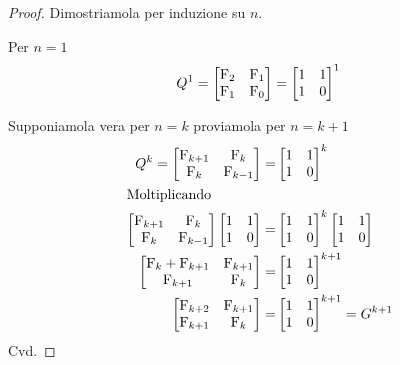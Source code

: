 \begin{proof}
	Dimostriamola per induzione su  $n$.
	
	Per $n=1$
	\[Q^1=\begin{bmatrix}
		\mathrm{F}_{2}&\mathrm{F}_{1}\\\mathrm{F}_{1}&\mathrm{F}_{0}
	\end{bmatrix}=\begin{bmatrix}
		1&1\\ 1&0\\
	\end{bmatrix}^1\\
	\]
	
	Supponiamola vera per $n=k$ proviamola per $n=k+1$
	\begin{align*}
		Q^k=\begin{bmatrix}
		\mathrm{F}_{k+1}&\mathrm{F}_{k}\\\mathrm{F}_{k}&\mathrm{F}_{k-1}
	\end{bmatrix}=&\begin{bmatrix}
		1&1\\ 1&0\\
	\end{bmatrix}^k\\
\intertext{Moltiplicando}
	\begin{bmatrix}
	\mathrm{F}_{k+1}&\mathrm{F}_{k}\\\mathrm{F}_{k}&\mathrm{F}_{k-1}
\end{bmatrix}\begin{bmatrix}
1&1\\ 1&0\\
\end{bmatrix}=&\begin{bmatrix}
	1&1\\ 1&0\\
\end{bmatrix}^k\begin{bmatrix}
1&1\\ 1&0\\
\end{bmatrix}\\
	\begin{bmatrix}
	\mathrm{F}_{k}+\mathrm{F}_{k+1}&\mathrm{F}_{k+1}\\\mathrm{F}_{k+1}&\mathrm{F}_{k}
\end{bmatrix}=&\begin{bmatrix}
	1&1\\ 1&0\\
\end{bmatrix}^{k+1}\\
	\begin{bmatrix}
	\mathrm{F}_{k+2}&\mathrm{F}_{k+1}\\\mathrm{F}_{k+1}&\mathrm{F}_{k}
\end{bmatrix}=&\begin{bmatrix}
	1&1\\ 1&0\\
\end{bmatrix}^{k+1}=G^{k+1}\\
	\end{align*}
Cvd.
\end{proof}
